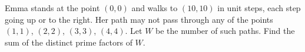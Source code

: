 Emma stands at the point $(0,0)$ and walks to $(10,10)$ in unit steps, each step going up or to the right. Her path may not pass through any of the points $(1,1)$, $(2,2)$, $(3,3)$, $(4,4)$. Let $W$ be the number of such paths. Find the sum of the distinct prime factors of $W$.
